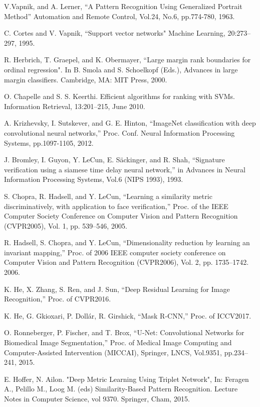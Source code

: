 \documentclass[runningheads,a4paper]{llncs}
\begin{document}
\begin{thebibliography}{4}

V.Vapnik,  and A. Lerner, ``A Pattern Recognition Using Generalized Portrait Method''  Automation and Remote Control, Vol.24, No.6, pp.774-780, 1963. 

C. Cortes and V. Vapnik, 
``Support vector networks" 
Machine Learning, 20:273–297, 1995.

R. Herbrich,  T. Graepel, and K. Obermayer, 
``Large margin rank boundaries for ordinal regression". 
In B. Smola and S. Schoelkopf (Eds.), Advances in large margin classifiers. Cambridge, MA: MIT Press, 2000.

O. Chapelle and S. S. Keerthi.  Efficient algorithms for ranking with SVMs. Information Retrieval, 13:201–215, June 2010.

A. Krizhevsky, I. Sutskever, and G. E. Hinton,
``ImageNet classification with deep convolutional neural networks,''
Proc. Conf. Neural Information Processing Systems, pp.1097-1105, 2012.

J. Bromley, I. Guyon, Y. LeCun, E. S\"ackinger, and R. Shah, 
``Signature verification using a siamese time delay neural network,''
in {Advances in Neural Information Processing Systems}, Vol.6 (NIPS 1993), 1993.

S. Chopra,  R. Hadsell, and Y. LeCun,
``Learning a similarity metric discriminatively, with application to face verification,'' 
Proc. of the IEEE Computer Society Conference on Computer Vision and Pattern Recognition (CVPR2005), Vol. 1, pp. 539–546, 2005.

R. Hadsell, S. Chopra, and Y. LeCun, 
``Dimensionality reduction by learning an invariant mapping,''
Proc. of 2006 IEEE computer society conference on Computer Vision and Pattern Recognition (CVPR2006), Vol. 2, pp. 1735–1742. 2006.


K. He, X. Zhang, S. Ren, and J. Sun, ``Deep Residual Learning for Image Recognition,'' Proc. of CVPR2016.

K. He, G. Gkioxari, P. Dollár, R. Girshick, ``Mask R-CNN,'' Proc. of ICCV2017.

O. Ronneberger, P. Fischer, and T. Brox, ``U-Net: Convolutional Networks for Biomedical Image Segmentation,'' Proc. of Medical Image Computing and Computer-Assisted Intervention (MICCAI), Springer, LNCS, Vol.9351, pp.234--241, 2015.

E. Hoffer, N. Ailon. 
"Deep Metric Learning Using Triplet Network",
In: Feragen A., Pelillo M., Loog M. (eds) Similarity-Based Pattern Recognition. Lecture Notes in Computer Science, vol 9370. Springer, Cham, 2015.
\end{thebibliography}
\end{document}
